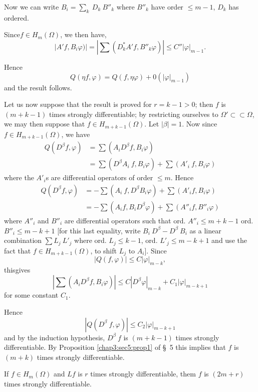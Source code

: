 Now we can write $B_i =\sum\limits_{k} ~ D_k ~ B''_k$ where $B''_k$
have order $\leq m-1$, $D_k$ has ordered. 

Since\pageoriginale $f \in H_m (\Omega )$, we then have,
$$
| A' f, B_i \varphi) | = | \sum (D^{*}_{k} A' f, B''_{k} \varphi ) |
\leq C''  | \varphi |_{m-1}. 
$$

Hence 
$$
Q(\eta f, \varphi ) = Q(f, \eta \varphi ) + 0 (| \varphi |_{m-1})
$$
and the result follows.

Let us now suppose that the result is proved for $r = k -1 > 0$; then
$f$ is $(m+k-1)$ times strongly differentiable; by restricting
ourselves to $\Omega' \subset \subset\Omega$, we may then suppose that $f \in
H_{m+k-1} (\Omega )$. Let $| \beta | = 1$. Now since $f \in H_{m+k
  -1}(\Omega)$, we have 
\begin{align*}
  Q(D^\beta f, \varphi ) & = \sum (A_i D^\beta f, B_i \varphi )\\
  & = \sum (D^\beta A_i ~ f, B_i \varphi ) + \sum (A'_i ~ f, B_i \varphi )
\end{align*}
where the $A'_i$s are differential operators of order $\leq m$. Hence
\begin{align*}
  Q(D^\beta f, \varphi ) & = - \sum (A_i ~ f, D^\beta  B_i \varphi ) +
  \sum (A'_i f, B_i \varphi )\\ 
  & =  - \sum (A_i f, B_i D^\beta \varphi ) + \sum (A''_i f, B''_i \varphi )
\end{align*}
where $A''_i$ and $B''_i$ are differential operators such that
ord. $A''_i \leq m+k -1$ ord. $B''_i \leq m -k +1$ [for this last
  equality, write $B_i ~ D^\beta - D^\beta ~ B_i$ as a linear
  combination $\sum L_j ~ L'_j$ where ord. $L_j \leq k -1$, ord. $L'_j
  \leq m-k+1$ and use the fact that $f \in H_{m+k-1}(\Omega)$, to
  shift $L_j $ to $A_i$]. Since 
$$
  | Q (f, \varphi) | \leq C | \varphi |_{m-k},
$$
this\pageoriginale gives 
$$
  \left| \sum (A_i D^\beta f, B_i \varphi )\right| \leq C | D^\beta \varphi
  |_{m-k} + C_1 | \varphi |_{m-k+1} 
$$
for some constant $C_1$.

Hence 
$$
| Q (D^\beta ~ f, \varphi ) | \leq C_2 | \varphi |_{m-k+1}
$$
and by the induction hypothesis, $D^\beta ~ f$ is $(m+k-1)$ times
strongly differentiable. By Proposition \ref{chap3:sec5:prop1} of \S\
5 this implies that $f$ is $(m+k)$ times strongly differentiable. 

\begin{proposition}\label{chap3:sec7:prop3}%
  If $f \in H_m (\Omega )$ and $Lf$ is $r$ times strongly
  differentiable, them $f$ is $(2m + r)$ times strongly
  differentiable. 
\end{proposition}

